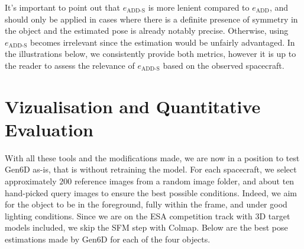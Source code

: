 \bigskip

It's important to point out that $e_{\mathrm{ADD}\text{-}\mathrm{S}}$ is more lenient compared to $e_\mathrm{ADD}$, and should only be applied in cases where there is a definite presence of symmetry in the object and the estimated pose is already notably precise. Otherwise, using $e_{\mathrm{ADD}\text{-}\mathrm{S}}$ becomes irrelevant since the estimation would be unfairly advantaged. In the illustrations below, we consistently provide both metrics, however it is up to the reader to assess the relevance of $e_{\mathrm{ADD}\text{-}\mathrm{S}}$ based on the observed spacecraft. 


\section{Vizualisation and Quantitative Evaluation}

With all these tools and the modifications made, we are now in a position to test Gen6D as-is, that is without retraining the model. For each spacecraft, we select approximately $200$ reference images from a random image folder, and about ten hand-picked query images to ensure the best possible conditions. Indeed, we aim for the object to be in the foreground, fully within the frame, and under good lighting conditions. Since we are on the \ac{ESA} competition track with 3D target models included, we skip the \ac{SFM} step with Colmap. Below are the best pose estimations made by Gen6D for each of the four objects.
 
\bigskip
\bigskip
\bigskip
\bigskip
 
